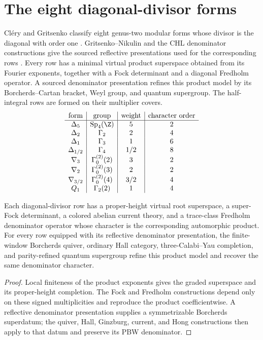 \chapter{The eight diagonal-divisor forms}
Cl\'ery and Gritsenko classify eight genus-two modular forms whose divisor is the diagonal with order one \cite{GC}.  Gritsenko--Nikulin and the CHL denominator constructions give the sourced reflective presentations used for the corresponding rows \cite{GN97,GN98a,GN98b,GovindarajanKrishna2009,Govindarajan2011,GovindarajanSamanta2019}.  Every row has a minimal virtual product superspace obtained from its Fourier exponents, together with a Fock determinant and a diagonal Fredholm operator.  A sourced denominator presentation refines this product model by its Borcherds--Cartan bracket, Weyl group, and quantum supergroup.  The half-integral rows are formed on their multiplier covers.
\[
\begin{array}{c|c|c|c}
\text{form}&\text{group}&\text{weight}&\text{character order}\\ \hline
\Delta_5&\operatorname{Sp}_4(\Z)&5&2\\
\Delta_2&\Gamma_2&2&4\\
\Delta_1&\Gamma_3&1&6\\
\Delta_{1/2}&\Gamma_4&1/2&8\\
\nabla_3&\Gamma^{(2)}_0(2)&3&2\\
\nabla_2&\Gamma^{(2)}_0(3)&2&2\\
\nabla_{3/2}&\Gamma^{(2)}_0(4)&3/2&4\\
Q_1&\Gamma_2(2)&1&4
\end{array}
\]

\begin{theorem}
Each diagonal-divisor row has a proper-height virtual root superspace, a super-Fock determinant, a colored abelian current theory, and a trace-class Fredholm denominator operator whose character is the corresponding automorphic product.  For every row equipped with its reflective denominator presentation, the finite-window Borcherds quiver, ordinary Hall category, three-Calabi--Yau completion, and parity-refined quantum supergroup refine this product model and recover the same denominator character.
\end{theorem}
\begin{proof}
Local finiteness of the product exponents gives the graded superspace and its proper-height completion.  The Fock and Fredholm constructions depend only on these signed multiplicities and reproduce the product coefficientwise.  A reflective denominator presentation supplies a symmetrizable Borcherds superdatum; the quiver, Hall, Ginzburg, current, and Hong constructions then apply to that datum and preserve its PBW denominator.
\end{proof}

